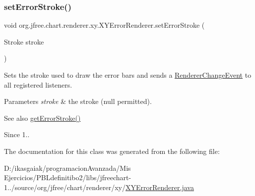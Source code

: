 \subsubsection{\texorpdfstring{set\+Error\+Stroke()}{setErrorStroke()}}
{\footnotesize\ttfamily void org.\+jfree.\+chart.\+renderer.\+xy.\+X\+Y\+Error\+Renderer.\+set\+Error\+Stroke (\begin{DoxyParamCaption}\item[{Stroke}]{stroke }\end{DoxyParamCaption})}

Sets the stroke used to draw the error bars and sends a \mbox{\hyperlink{}{Renderer\+Change\+Event}} to all registered listeners.


\begin{DoxyParams}{Parameters}
{\em stroke} & the stroke ({\ttfamily null} permitted).\\
\hline
\end{DoxyParams}
\begin{DoxySeeAlso}{See also}
\mbox{\hyperlink{classorg_1_1jfree_1_1chart_1_1renderer_1_1xy_1_1_x_y_error_renderer_a217ac2f91bafbe4f294e017c678be249}{get\+Error\+Stroke()}}
\end{DoxySeeAlso}
\begin{DoxySince}{Since}
1.. 
\end{DoxySince}


The documentation for this class was generated from the following file\+:\begin{DoxyCompactItemize}
\item 
D\+:/ikasgaiak/programacion\+Avanzada/\+Mis Ejercicios/\+P\+B\+Ldefinitibo2/libs/jfreechart-\/1../source/org/jfree/chart/renderer/xy/\mbox{\hyperlink{_x_y_error_renderer_8java}{X\+Y\+Error\+Renderer.\+java}}\end{DoxyCompactItemize}
